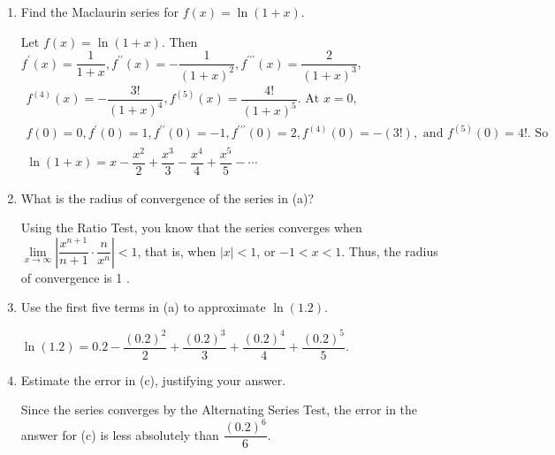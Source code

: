 \newpage




\question
\begin{enumerate}
\renewcommand{\labelenumi}{(\alph{enumi})}
\item Find the Maclaurin series for $f(x)=\ln (1+x)$.
\begin{solutionorbox}[2in]
Let $f(x)=\ln (1+x)$. Then $f^{\prime}(x)=\dfrac{1}{1+x}, f^{\prime \prime}(x)=-\dfrac{1}{(1+x)^{2}}, f^{\prime \prime \prime}(x)=\dfrac{2}{(1+x)^{3}}$,
\[
\begin{gathered}
f^{(4)}(x)=-\dfrac{3!}{(1+x)^{4}}, f^{(5)}(x)=\dfrac{4!}{(1+x)^{5}} \text {. At } x=0, \\
f(0)=0, f^{\prime}(0)=1, f^{\prime \prime}(0)=-1, f^{\prime \prime \prime}(0)=2, f^{(4)}(0)=-(3!), \text { and } f^{(5)}(0)=4!. \text { So } \\
\ln (1+x)=x-\dfrac{x^{2}}{2}+\dfrac{x^{3}}{3}-\dfrac{x^{4}}{4}+\dfrac{x^{5}}{5}-\cdots
\end{gathered}
\]
\end{solutionorbox}
\item What is the radius of convergence of the series in (a)?
\begin{solutionorbox}[1.5in]
Using the Ratio Test, you know that the series converges when $\lim\limits_{x \to \infty}\left|\dfrac{x^{n+1}}{n+1} \cdot \dfrac{n}{x^{n}}\right|<1$, that is, when $|x|<1$, or $-1<x<1$. Thus, the radius of convergence is 1 .
\end{solutionorbox}
\item Use the first five terms in (a) to approximate $\ln (1.2)$.
\begin{solutionorbox}[1in]
$\ln (1.2)=0.2-\dfrac{(0.2)^{2}}{2}+\dfrac{(0.2)^{3}}{3}+\dfrac{(0.2)^{4}}{4}+\dfrac{(0.2)^{5}}{5}$.
\end{solutionorbox}
\item Estimate the error in (c), justifying your answer.
\begin{solutionorbox}[1.5in]
Since the series converges by the Alternating Series Test, the error in the answer for (c) is less absolutely than $\dfrac{(0.2)^{6}}{6}$.
\end{solutionorbox}
\end{enumerate}



